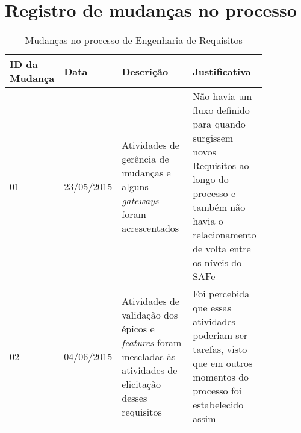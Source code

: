 \chapter{Registro de mudanças no processo}

\begin{table*}[!h]
\caption{Mudanças no processo de Engenharia de Requisitos}
\label{Rotulo}
  \begin{tabular}{p{0.10\linewidth}p{0.15\linewidth}p{0.30\linewidth}p{0.30\linewidth}}
  \hline
  ID da Mudança & Data & Descrição & Justificativa \\
  \hline

  01 & 23/05/2015 & Atividades de gerência de mudanças e alguns \textit{gateways} foram acrescentados & Não havia um fluxo definido para quando
  surgissem novos Requisitos ao longo do processo e também não havia o relacionamento de volta entre os níveis do SAFe\\

  02 & 04/06/2015 & Atividades de validação dos épicos e \textit{features} foram mescladas às atividades de elicitação desses requisitos & Foi percebida
  que essas atividades poderiam ser tarefas, visto que em outros momentos do processo foi estabelecido assim\\

  \hline
  \end{tabular}
\end{table*}

